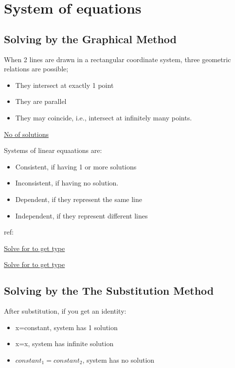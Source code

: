\documentclass[openany]{book}
\begin{document}
\section{System of equations}

\subsection{Solving by the Graphical Method}

When 2 lines are drawn in a rectangular coordinate system, three geometric relations are possible;
\begin{itemize}
	\item They intersect at exactly 1 point
	\item They are parallel
	\item They may coincide, i.e., intersect at infinitely many points.
\end{itemize}

\href{https://www.youtube.com/watch?v=bq5gDsEdN3Q&t=100s}{No of solutions}

Systems of linear equaations are:
\begin{itemize}
	\item Consistent, if having 1 or more solutions
	\item Inconsistent, if having no solution.
	\item Dependent, if they represent the same line
	\item Independent, if they represent different lines
\end{itemize}

ref:

\href{https://www.cuemath.com/ncert-solutions/i-for-which-values-of-a-and-b-will-the-following-pair-of-linear-equations-have-an-infinite-number-of-solutions-2x-3y-7-a-b-x-a-b-y-3a-b-2-ii-for-which-value-of-k-will-the/}{Solve for to get type}

\href{https://brainly.com/question/46551990}{Solve for to get type}

\subsection{Solving by the The Substitution Method}

After substitution, if you get an identity:
\begin{itemize}
	\item x=constant, system has 1 solution
	\item x=x, system has infinite solution
	\item \(constant_1=constant_2\), system has no solution
\end{itemize}
\end{document}
